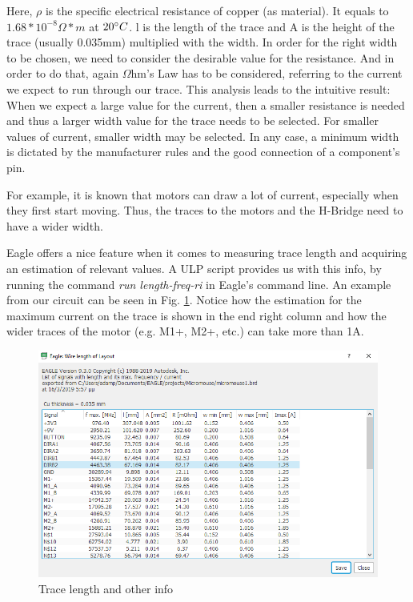 Here, $\rho$ is the specific electrical resistance of copper (as material). It equals to $1.68*10^{-8} \Omega *m$ at $20 \degree C$.
l is the length of the trace and A is the height of the trace (usually 0.035mm) multiplied with the width.
In order for the right width to be chosen, we need to consider the desirable value for the resistance. And in order to do that, again $\Omega$hm's Law has to be considered, referring to the current we expect to run through our trace.
This analysis leads to the intuitive result: When we expect a large value for the current, then a smaller resistance is needed and thus a larger width value for the trace needs to be selected. For smaller values of current, smaller width may be selected. In any case, a minimum width is dictated by the manufacturer rules and the good connection of a component's pin.

For example, it is known that motors can draw a lot of current, especially when they first start moving. Thus, the traces to the motors and the H-Bridge need to have a wider width.

Eagle offers a nice feature when it comes to measuring trace length and acquiring an estimation of relevant values. A ULP script provides us with this info, by running the command \textit{run length-freq-ri} in Eagle's command line. An example from our circuit can be seen in Fig. \ref{fig:length}. Notice how the estimation for the maximum current on the trace is shown in the end right column and how the wider traces of the motor (e.g. M1+, M2+, etc.) can take more than 1A.

\begin{figure}[htb]
    \centering
    \includegraphics[width=1\textwidth]{figures/hardware/ULP.PNG}
    \caption{Trace length and other info}
    \label{fig:length}
\end{figure}

